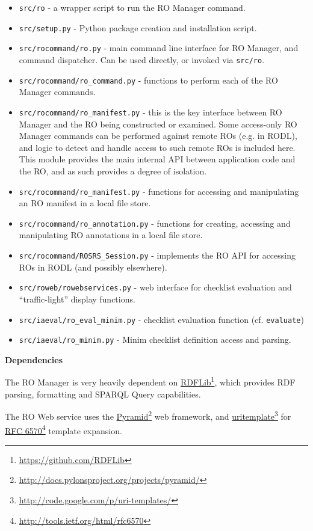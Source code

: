 \documentclass[11pt,oneside]{article}
\def\mybibliostyle{plain}
\def\mybibliocommand{}
\begin{document}
\begin{itemize}

\item \texttt{src/ro} - a wrapper script to run the RO Manager command.
\item \texttt{src/setup.py} - Python package creation and installation script.
\item \texttt{src/rocommand/ro.py} - main command line interface for RO Manager, and command dispatcher.  Can be used directly, or invoked via \texttt{src/ro}.
\item \texttt{src/rocommand/ro\_command.py} - functions to perform each of the RO Manager commands.
\item \texttt{src/rocommand/ro\_manifest.py} - this is the key interface between RO Manager and the RO being constructed or examined.  Some access-only RO Manager commands can be performed against remote ROs (e.g. in RODL), and logic to detect and handle access to such remote ROs is included here.  This module provides the main internal API between application code and the RO, and as such provides a degree of isolation.
\item \texttt{src/rocommand/ro\_manifest.py} - functions for accessing and manipulating an RO manifest in a local file store.
\item \texttt{src/rocommand/ro\_annotation.py} - functions for creating, accessing and manipulating RO annotations in a local file store.
\item \texttt{src/rocommand/ROSRS\_Session.py} - implements the RO API for accessing ROs in RODL (and possibly elsewhere).
\item \texttt{src/roweb/rowebservices.py} - web interface for checklist evaluation and ``traffic-light'' display functions.
\item \texttt{src/iaeval/ro\_eval\_minim.py} - checklist evaluation function (cf. \texttt{evaluate})
\item \texttt{src/iaeval/ro\_minim.py} - Minim checklist definition access and parsing.
\end{itemize}

\textbf{Dependencies}
\label{dependencies}

The RO Manager is very heavily dependent on \href{https://github.com/RDFLib}{RDFLib}\footnote{\href{https://github.com/RDFLib}{https://github.com/RDFLib}}, which provides RDF parsing, formatting and SPARQL Query capabilities.

The RO Web service uses the \href{http://docs.pylonsproject.org/projects/pyramid/}{Pyramid}\footnote{\href{http://docs.pylonsproject.org/projects/pyramid/}{http://docs.pylonsproject.org/projects/pyramid/}} web framework, and \href{http://code.google.com/p/uri-templates/}{uritemplate}\footnote{\href{http://code.google.com/p/uri-templates/}{http://code.google.com/p/uri-templates/}} for \href{http://tools.ietf.org/html/rfc6570}{RFC 6570}\footnote{\href{http://tools.ietf.org/html/rfc6570}{http://tools.ietf.org/html/rfc6570}} template expansion.


\mybibliocommand
\end{document}
